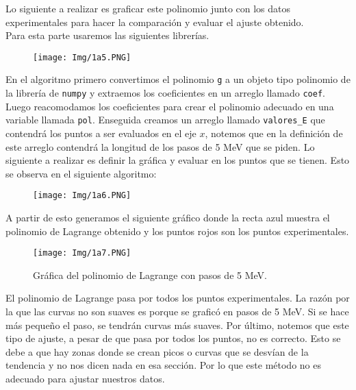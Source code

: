 \documentclass[11pt]{article}
\begin{document}
	Lo siguiente a realizar es graficar este polinomio junto con los datos experimentales para hacer la comparación y evaluar el ajuste obtenido.\\
	Para esta parte usaremos las siguientes librerías.
	\begin{figure}[h]
		\centering
		\texttt{[image: Img/1a5.PNG]}
	\end{figure}
	
	En el algoritmo primero convertimos el polinomio \texttt{g} a un objeto tipo polinomio de la librería de \texttt{numpy} y extraemos los coeficientes en un arreglo llamado \texttt{coef}. Luego reacomodamos los coeficientes para crear el polinomio adecuado en una variable llamada \texttt{pol}. Enseguida creamos un arreglo llamado \texttt{valores\_E} que contendrá los puntos a ser evaluados en el eje $x$, notemos que en la definición de este arreglo contendrá la longitud de los pasos de 5 MeV que se piden. Lo siguiente a realizar es definir la gráfica y evaluar en los puntos que se tienen. Esto se observa en el siguiente algoritmo:
\newpage
	\begin{figure}[h]
		\centering
		\texttt{[image: Img/1a6.PNG]}
	\end{figure}
	
	A partir de esto generamos el siguiente gráfico donde la recta azul muestra el polinomio de Lagrange obtenido y los puntos rojos son los puntos experimentales.
	\begin{figure}[h]
		\centering
		\texttt{[image: Img/1a7.PNG]}
		\caption{Gráfica del polinomio de Lagrange con pasos de 5 MeV.}
		\label{Lagrange}
	\end{figure}
	
	El polinomio de Lagrange pasa por todos los puntos experimentales. La razón por la que las curvas no son suaves es porque se graficó en pasos de 5 MeV. Si se hace más pequeño el paso, se tendrán curvas más suaves. Por último, notemos que este tipo de ajuste, a pesar de que pasa por todos los puntos, no es correcto. Esto se debe a que hay zonas donde se crean picos o curvas que se desvían de la tendencia y no nos dicen nada en esa sección. Por lo que este método no es adecuado para ajustar nuestros datos.
	
	
	
\end{document}
